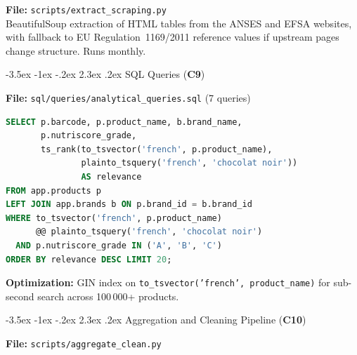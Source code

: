 \documentclass[a4paper,11pt,oneside,openany]{report}
\makeatletter
\renewcommand\section{\@startsection{section}{1}{\z@}%
  {-3.5ex \@plus -1ex \@minus -.2ex}%
  {2.3ex \@plus.2ex}%
  {\normalfont\Large\bfseries\color{ntgreen}}}
\newcommand{\competence}[1]{\textbf{\textcolor{ntgreen}{#1}}}
\makeatother
\begin{document}
\textbf{File:} \texttt{scripts/extract\_scraping.py}\\
BeautifulSoup extraction of HTML tables from the ANSES and EFSA
websites, with fallback to EU Regulation~1169/2011 reference values
if upstream pages change structure. Runs monthly.


\section{SQL Queries (\competence{C9})}
\label{sec:c9}

\textbf{File:} \texttt{sql/queries/analytical\_queries.sql} (7 queries)

\begin{lstlisting}[language=SQL, caption={Query 2 --- Full-text search with Nutri-Score filter}]
SELECT p.barcode, p.product_name, b.brand_name,
       p.nutriscore_grade,
       ts_rank(to_tsvector('french', p.product_name),
               plainto_tsquery('french', 'chocolat noir'))
               AS relevance
FROM app.products p
LEFT JOIN app.brands b ON p.brand_id = b.brand_id
WHERE to_tsvector('french', p.product_name)
      @@ plainto_tsquery('french', 'chocolat noir')
  AND p.nutriscore_grade IN ('A', 'B', 'C')
ORDER BY relevance DESC LIMIT 20;
\end{lstlisting}

\textbf{Optimization:} GIN index on \texttt{to\_tsvector('french',
product\_name)} for sub-second search across 100\,000+ products.


\section{Aggregation and Cleaning Pipeline (\competence{C10})}
\label{sec:c10}

\textbf{File:} \texttt{scripts/aggregate\_clean.py}
\end{document}

